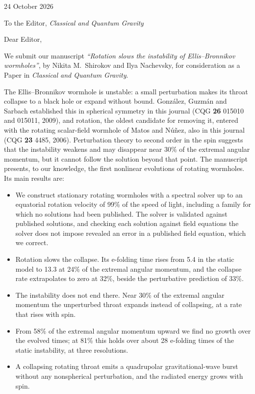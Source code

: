 \documentclass[11pt]{article}
\begin{document}
\begin{flushright}
24 October 2026
\end{flushright}

To the Editor, \emph{Classical and Quantum Gravity}

Dear Editor,

We submit our manuscript \emph{``Rotation slows the instability of Ellis--Bronnikov wormholes''}, by Nikita M.\ Shirokov and Ilya Nachevsky, for consideration as a Paper in \emph{Classical and Quantum Gravity}.

The Ellis--Bronnikov wormhole is unstable: a small perturbation makes its throat collapse to a black hole or expand without bound. Gonz\'alez, Guzm\'an and Sarbach established this in spherical symmetry in this journal (CQG \textbf{26} 015010 and 015011, 2009), and rotation, the oldest candidate for removing it, entered with the rotating scalar-field wormhole of Matos and N\'u\~nez, also in this journal (CQG \textbf{23} 4485, 2006). Perturbation theory to second order in the spin suggests that the instability weakens and may disappear near 30\% of the extremal angular momentum, but it cannot follow the solution beyond that point. The manuscript presents, to our knowledge, the first nonlinear evolutions of rotating wormholes. Its main results are:

\begin{itemize}\setlength{\itemsep}{0.2em}
\item We construct stationary rotating wormholes with a spectral solver up to an equatorial rotation velocity of 99\% of the speed of light, including a family for which no solutions had been published. The solver is validated against published solutions, and checking each solution against field equations the solver does not impose revealed an error in a published field equation, which we correct.
\item Rotation slows the collapse. Its e-folding time rises from 5.4 in the static model to 13.3 at 24\% of the extremal angular momentum, and the collapse rate extrapolates to zero at 32\%, beside the perturbative prediction of 33\%.
\item The instability does not end there. Near 30\% of the extremal angular momentum the unperturbed throat expands instead of collapsing, at a rate that rises with spin.
\item From 58\% of the extremal angular momentum upward we find no growth over the evolved times; at 81\% this holds over about 28 e-folding times of the static instability, at three resolutions.
\item A collapsing rotating throat emits a quadrupolar gravitational-wave burst without any nonspherical perturbation, and the radiated energy grows with spin.
\end{itemize}
\end{document}
